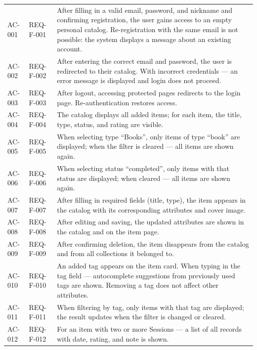 \begin{longtable}{L{2cm} L{2.5cm} L{9.5cm}}
AC-001 & REQ-F-001 & After filling in a valid email, password, and nickname and confirming registration, the user gains access to an empty personal catalog. Re-registration with the same email is not possible: the system displays a message about an existing account.  \\
\addlinespace
AC-002 & REQ-F-002 & After entering the correct email and password, the user is redirected to their catalog. With incorrect credentials --- an error message is displayed and login does not proceed.  \\
\addlinespace
AC-003 & REQ-F-003 & After logout, accessing protected pages redirects to the login page. Re-authentication restores access.  \\
\addlinespace
AC-004 & REQ-F-004 & The catalog displays all added items; for each item, the title, type, status, and rating are visible.  \\
\addlinespace
AC-005 & REQ-F-005 & When selecting type ``Books'', only items of type ``book'' are displayed; when the filter is cleared --- all items are shown again.  \\
\addlinespace
AC-006 & REQ-F-006 & When selecting status ``completed'', only items with that status are displayed; when cleared --- all items are shown again.  \\
\addlinespace
AC-007 & REQ-F-007 & After filling in required fields (title, type), the item appears in the catalog with its corresponding attributes and cover image.  \\
\addlinespace
AC-008 & REQ-F-008 & After editing and saving, the updated attributes are shown in the catalog and on the item page.  \\
\addlinespace
AC-009 & REQ-F-009 & After confirming deletion, the item disappears from the catalog and from all collections it belonged to.  \\
\addlinespace
AC-010 & REQ-F-010 & An added tag appears on the item card. When typing in the tag field --- autocomplete suggestions from previously used tags are shown. Removing a tag does not affect other attributes.  \\
\addlinespace
AC-011 & REQ-F-011 & When filtering by tag, only items with that tag are displayed; the result updates when the filter is changed or cleared.  \\
\addlinespace
AC-012 & REQ-F-012 & For an item with two or more Sessions --- a list of all records with date, rating, and note is shown.  \\

\end{longtable}
